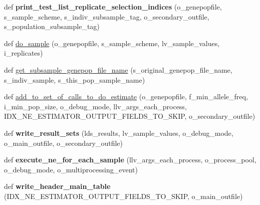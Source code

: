 \begin{DoxyCompactItemize}
\item 
def {\bfseries print\+\_\+test\+\_\+list\+\_\+replicate\+\_\+selection\+\_\+indices} (o\+\_\+genepopfile, s\+\_\+sample\+\_\+scheme, s\+\_\+indiv\+\_\+subsample\+\_\+tag, o\+\_\+secondary\+\_\+outfile, s\+\_\+population\+\_\+subsample\+\_\+tag)\hypertarget{namespacenegui_1_1pgdriveneestimator_a97627c981f1e2e59eecd69efb11c7044}{}\label{namespacenegui_1_1pgdriveneestimator_a97627c981f1e2e59eecd69efb11c7044}

\item 
def \hyperlink{namespacenegui_1_1pgdriveneestimator_aa5f7fc02442df628112ba81a98a3691e}{do\+\_\+sample} (o\+\_\+genepopfile, s\+\_\+sample\+\_\+scheme, lv\+\_\+sample\+\_\+values, i\+\_\+replicates)
\item 
def \hyperlink{namespacenegui_1_1pgdriveneestimator_a84955fc339f0354149185b5fa6444340}{get\+\_\+subsample\+\_\+genepop\+\_\+file\+\_\+name} (s\+\_\+original\+\_\+genepop\+\_\+file\+\_\+name, s\+\_\+indiv\+\_\+sample, s\+\_\+this\+\_\+pop\+\_\+sample\+\_\+name)
\item 
def \hyperlink{namespacenegui_1_1pgdriveneestimator_ad4d8f98c3864bd57b05a6bd28f1f0619}{add\+\_\+to\+\_\+set\+\_\+of\+\_\+calls\+\_\+to\+\_\+do\+\_\+estimate} (o\+\_\+genepopfile, f\+\_\+min\+\_\+allele\+\_\+freq, i\+\_\+min\+\_\+pop\+\_\+size, o\+\_\+debug\+\_\+mode, llv\+\_\+args\+\_\+each\+\_\+process, I\+D\+X\+\_\+\+N\+E\+\_\+\+E\+S\+T\+I\+M\+A\+T\+O\+R\+\_\+\+O\+U\+T\+P\+U\+T\+\_\+\+F\+I\+E\+L\+D\+S\+\_\+\+T\+O\+\_\+\+S\+K\+IP, o\+\_\+secondary\+\_\+outfile)
\item 
def {\bfseries write\+\_\+result\+\_\+sets} (lds\+\_\+results, lv\+\_\+sample\+\_\+values, o\+\_\+debug\+\_\+mode, o\+\_\+main\+\_\+outfile, o\+\_\+secondary\+\_\+outfile)\hypertarget{namespacenegui_1_1pgdriveneestimator_aa45ae8154c350b0a30ba8c1037bfd445}{}\label{namespacenegui_1_1pgdriveneestimator_aa45ae8154c350b0a30ba8c1037bfd445}

\item 
def {\bfseries execute\+\_\+ne\+\_\+for\+\_\+each\+\_\+sample} (llv\+\_\+args\+\_\+each\+\_\+process, o\+\_\+process\+\_\+pool, o\+\_\+debug\+\_\+mode, o\+\_\+multiprocessing\+\_\+event)\hypertarget{namespacenegui_1_1pgdriveneestimator_aefaaafaa951edf46424dfc57535046a7}{}\label{namespacenegui_1_1pgdriveneestimator_aefaaafaa951edf46424dfc57535046a7}

\item 
def {\bfseries write\+\_\+header\+\_\+main\+\_\+table} (I\+D\+X\+\_\+\+N\+E\+\_\+\+E\+S\+T\+I\+M\+A\+T\+O\+R\+\_\+\+O\+U\+T\+P\+U\+T\+\_\+\+F\+I\+E\+L\+D\+S\+\_\+\+T\+O\+\_\+\+S\+K\+IP, o\+\_\+main\+\_\+outfile)\hypertarget{namespacenegui_1_1pgdriveneestimator_adffb79ac878373773c2927935685788d}{}\label{namespacenegui_1_1pgdriveneestimator_adffb79ac878373773c2927935685788d}


\end{DoxyCompactItemize}
